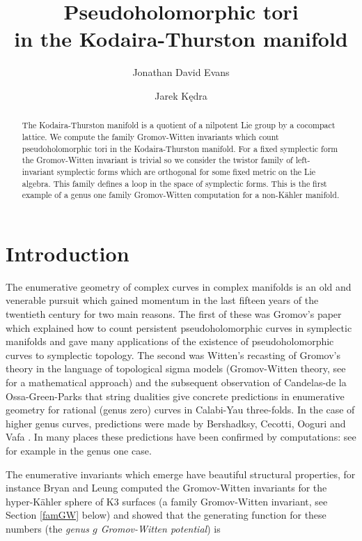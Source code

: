 \documentclass[11pt]{amsart}
\title[Pseudoholomorphic tori in Kodaira-Thurston]{Pseudoholomorphic tori \\ in the Kodaira-Thurston manifold}
\author{Jonathan David Evans}
\author{Jarek K\k{e}dra}
\numberwithin{equation}{section}
\theoremstyle{definition}
\theoremstyle{remark}
\begin{document}
\begin{abstract}
The Kodaira-Thurston manifold is a quotient of a nilpotent Lie group by a cocompact lattice. We compute the family Gromov-Witten invariants which count pseudoholomorphic tori in the Kodaira-Thurston ma\-ni\-fold. For a fixed symplectic form the Gromov-Witten invariant is trivial so we consider the twistor family of left-invariant symplectic forms which are orthogonal for some fixed metric on the Lie algebra. This family defines a loop in the space of symplectic forms. This is the first example of a genus one family Gromov-Witten computation for a non-K\"ahler manifold.
\end{abstract}
\maketitle


\section{Introduction}

The enumerative geometry of complex curves in complex manifolds is an old and venerable pursuit \cite{Klei} which gained momentum in the last fifteen years of the twentieth century for two main reasons. The first of these was Gromov's paper \cite{Gro} which explained how to count persistent pseudoholomorphic curves in symplectic manifolds and gave many applications of the existence of pseudoholomorphic curves to symplectic topology. The second was Witten's recasting \cite{W} of Gromov's theory in the language of topological sigma models (Gromov-Witten theory, see \cite{RT1,RT2} for a mathematical approach) and the subsequent observation \cite{COGP} of Candelas-de la Ossa-Green-Parks that string dualities give concrete predictions in enumerative geometry for rational (genus zero) curves in Calabi-Yau three-folds. In the case of higher genus curves, predictions were made by Bershadksy, Cecotti, Ooguri and Vafa \cite{BCOV}. In many places these predictions have been confirmed by computations: see for example \cite{Z} in the genus one case.

The enumerative invariants which emerge have beautiful structural properties, for instance Bryan and Leung \cite{BL} computed the Gromov-Witten invariants for the hyper-K\"{a}hler sphere of K3 surfaces (a family Gromov-Witten invariant, see Section \ref{famGW} below) and showed that the generating function for these numbers (the {\em genus $g$ Gromov-Witten potential}) is
\end{document}

